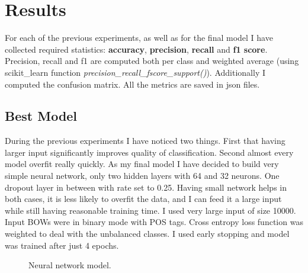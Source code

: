 \documentclass{article}
\begin{document}
\newpage

\section{Results}
For each of the previous experiments, as well as for the final model I have collected required statistics:
\textbf{accuracy}, \textbf{precision}, \textbf{recall} and \textbf{f1 score}. Precision, recall and f1 are
computed both per class and weighted average 
(using scikit\_learn function \textit{precision\_recall\_fscore\_support()}). 
Additionally I computed the confusion matrix. 
All the metrics are saved in json files.


\subsection{Best Model}
During the previous experiments I have noticed two things. First that having larger input
significantly improves quality of classification. Second almost every model overfit
really quickly. As my final model I have decided to build very simple neural network,
only two hidden layers with 64 and 32 neurons. One dropout layer in between with rate set to 0.25.
Having small network helps in both cases, it is less likely to overfit the data, and I can
feed it a large input while still having reasonable training time.
I used very large input of size 10000. Input BOWs were in binary mode with POS tags.
Cross entropy loss function was weighted to deal with the unbalanced classes. I used early
stopping and model was trained after just 4 epochs. 

\begin{figure}[h]	
	\begin{center}
        \caption{Neural network model.}
	\end{center}
\end{figure}
\end{document}
